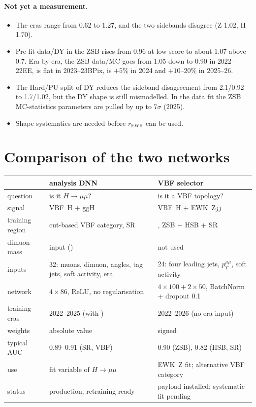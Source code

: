 \documentclass[11pt,a4paper]{article}
\begin{document}
\paragraph{Not yet a measurement.}
\begin{itemize}
  \item The eras range from 0.62 to 1.27, and the two sidebands disagree
  (Z 1.02, H 1.70).
  \item Pre-fit data/DY in the ZSB rises from 0.96 at low score to about 1.07
  above 0.7. Era by era, the ZSB data/MC goes from 1.05 down to 0.90 in 2022--22EE,
  is flat in 2023--23BPix, is $+5\%$ in 2024 and $+10$--$20\%$ in 2025--26.
  \item The Hard/PU split of DY reduces the sideband disagreement from
  2.1/0.92 to 1.7/1.02, but the DY shape is still mismodelled. In the data fit
  the ZSB MC-statistics parameters are pulled by up to $7\sigma$ (2025).
  \item Shape systematics are needed before $r_\text{EWK}$ can be used.
\end{itemize}

\section{Comparison of the two networks}

\begin{table}[H]\centering\small
\begin{tabularx}{\textwidth}{lYY}
\toprule
& analysis DNN & VBF selector \\
\midrule
question & is it $H\to\mu\mu$? & is it a VBF topology? \\
signal & VBF~H + ggH & VBF~H + EWK~Z$jj$ \\
training region & cut-based VBF category, SR & , ZSB + HSB + SR \\
dimuon mass & input () & not used \\
inputs & 32: muons, dimuon, angles, tag jets, soft activity, era & 24: four leading jets, $p_T^{\mu\mu}$, soft activity \\
network & $4\times86$, ReLU, no regularisation & $4\times100 + 2\times50$, BatchNorm + dropout 0.1 \\
training eras & 2022--2025 (with ) & 2022--2026 (no era input) \\
weights & absolute value & signed \\
typical AUC & 0.89--0.91 (SR, VBF) & 0.90 (ZSB), 0.82 (HSB, SR) \\
use & fit variable of $H\to\mu\mu$ & EWK~Z fit; alternative VBF category \\
status & production; retraining ready & payload  installed; systematic fit pending \\
\bottomrule
\end{tabularx}
\end{table}
\end{document}
